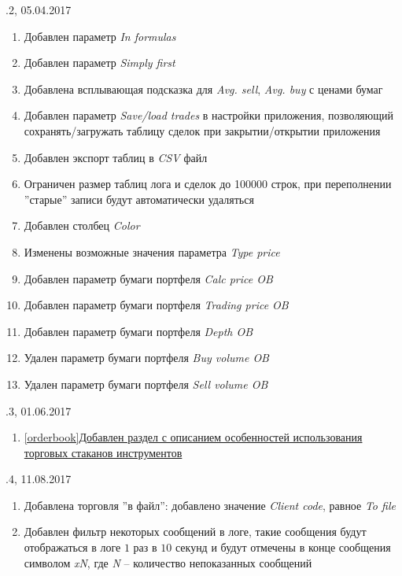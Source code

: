\vspace{5mm}

.2, 05.04.2017
\begin{enumerate}
	\item Добавлен параметр \textit{In formulas}
	\item Добавлен параметр \textit{Simply first}
	\item Добавлена всплывающая подсказка для \textit{Avg. sell}, \textit{Avg. buy} с ценами бумаг
	\item Добавлен параметр \textit{Save/load trades} в настройки приложения, позволяющий сохранять/загружать таблицу сделок при закрытии/открытии приложения
	\item Добавлен экспорт таблиц в \textit{CSV} файл
	\item Ограничен размер таблиц лога и сделок до 100000 строк, при переполнении ''старые'' записи будут автоматически удаляться
	\item Добавлен столбец \textit{Color}
	\item Изменены возможные значения параметра \textit{Type price}
	\item Добавлен параметр бумаги портфеля \textit{Calc price OB}
	\item Добавлен параметр бумаги портфеля \textit{Trading price OB}
	\item Добавлен параметр бумаги портфеля \textit{Depth OB}
	\item Удален параметр бумаги портфеля \textit{Buy volume OB}
	\item Удален параметр бумаги портфеля \textit{Sell volume OB}
\end{enumerate}

\vspace{5mm}

.3, 01.06.2017
\begin{enumerate}
	\item \hyperref[orderbook]{\ref{orderbook}Добавлен раздел с описанием особенностей использования торговых стаканов инструментов}
\end{enumerate}

\vspace{5mm}

.4, 11.08.2017
\begin{enumerate}
	\item Добавлена торговля ''в файл'': добавлено значение \textit{Client code}, равное \textit{To file}
	\item Добавлен фильтр некоторых сообщений в логе, такие сообщения будут отображаться в логе $1$ раз в $10$ секунд и будут отмечены в конце сообщения символом \textit{xN}, где \textit{N} -- количество непоказанных сообщений
\end{enumerate}

